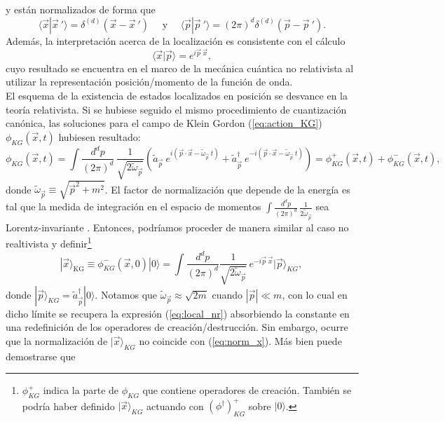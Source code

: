 y están normalizados de forma que
\begin{equation}
\langle \vec{x}|\vec{x}\:'\rangle=\delta^{(d)}(\vec{x}-\vec{x}\:')\:\:\:\:\:\: \text{y} \:\:\:\:\:\:\langle \vec{p}|\vec{p}\:'\rangle=(2\pi)^d\delta^{(d)}(\vec{p}-\vec{p}\:').
\label{eq:norm_x}
\end{equation}
Además, la interpretación acerca de la localización es consistente con el cálculo
\begin{equation}
\langle \vec{x}|\vec{p} \rangle=e^{i\vec{p}\:\vec{x}},
\end{equation}
cuyo resultado se encuentra en el marco de la mecánica cuántica no relativista al utilizar la representación posición/momento de la función de onda.\\

El esquema de la existencia de estados localizados en posición se desvance en la teoría relativista. Si se hubiese seguido el mismo procedimiento de cuantización canónica, las soluciones para el campo de Klein Gordon (\ref{eq:action_KG}) $\phi_{KG}(\vec{x},t)$ hubiesen resultado\cite{Greiner:1996}:
\begin{equation}
\phi_{KG} (\vec{x},t)=\int \frac{d^dp}{(2\pi)^d}\,\frac{1}{\sqrt{2\tilde{\omega}_{\vec{p}}}} \left(\tilde{a}_{\vec{p}}\:e^{i(\vec{p}\cdot\vec{x}-\tilde{\omega}_{\vec{p}}\:t)}+\tilde{a}_{\vec{p}}^{\dag}\:e^{-i(\vec{p}\cdot\vec{x}-\tilde{\omega}_{\vec{p}}\:t)}\right)=\phi^{+}_{KG} (\vec{x},t)+\phi^{-}_{KG} (\vec{x},t),\,
\end{equation}
donde $\tilde{\omega}_{\vec{p}}\equiv \sqrt{\vec{p}^2+m^2}$. El factor de normalización que depende de la energía es tal que la medida de integración en el espacio de momentos $\int \frac{d^dp}{(2\pi)^d}\,\frac{1}{2\tilde{\omega}_{\vec{p}}}$ sea Lorentz-invariante \cite{Tong:2007}. Entonces, podríamos proceder de manera similar al caso no realtivista y definir\footnote{$\phi^+_{KG}$ indica la parte de $\phi_{KG}$ que contiene operadores de creación. También se podría haber definido $|\vec{x}\rangle_{KG}$ actuando con $(\phi^{\dag})^{+}_{KG}$ sobre $|0\rangle$.}
\begin{equation}
|\vec{x} \rangle_{\text{KG}}\equiv \phi^{-}_{KG}(\vec{x},0)|0\rangle=\int \frac{d^dp}{(2\pi)^d} \frac{1}{\sqrt{2\tilde{\omega}_{\vec{p}}}}\,e^{-i\vec{p}\:\vec{x}}|\vec{p}\rangle_{KG} ,\,
\end{equation}
donde $|\vec{p}\rangle_{KG} = \tilde{a}_{\vec{p}}^{\dag}|0\rangle$. Notamos que $\tilde{\omega}_{\vec{p}}\approx \sqrt{2m}$ cuando $|\vec{p}| \ll m$, con lo cual en dicho límite se recupera la expresión (\ref{eq:local_nr}) absorbiendo la constante en una redefinición de los operadores de creación/destrucción. Sin embargo, ocurre que la normalización de $|\vec{x}\rangle_{KG}$ no coincide con (\ref{eq:norm_x}). Más bien puede demostrarse que
